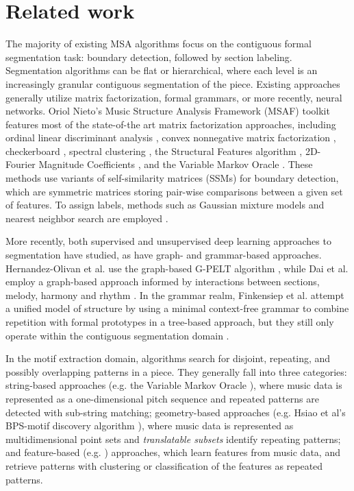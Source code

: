 \documentclass{article}
\begin{document}
\section{Related work}\label{sec:related_work}
The majority of existing MSA algorithms focus on the contiguous formal segmentation task: boundary detection, followed by section labeling. Segmentation algorithms can be flat or hierarchical, where each level is an increasingly granular contiguous segmentation of the piece. Existing approaches generally utilize matrix factorization, formal grammars, or more recently, neural networks. Oriol Nieto's Music Structure Analysis Framework (MSAF) toolkit \cite{msaf} features most of the state-of-the art matrix factorization approaches, including ordinal linear discriminant analysis \cite{olda}, convex nonnegative matrix factorization \cite{cnmf}, checkerboard \cite{checkerboard}, spectral clustering \cite{scluster}, the Structural Features algorithm \cite{sf}, 2D-Fourier Magnitude Coefficients \cite{2dfmc}, and the Variable Markov Oracle \cite{vmo_segmentation}. These methods use variants of self-similarity matrices (SSMs) for boundary detection, which are symmetric matrices storing pair-wise comparisons between a given set of features. To assign labels, methods such as Gaussian mixture models and nearest neighbor search are employed \cite{msaf}. 

More recently, both supervised \cite{wang_2021} and unsupervised \cite{mccallum_2021, buisson_2022} deep learning approaches to segmentation have studied, as have graph- and grammar-based approaches. Hernandez-Olivan et al. use the graph-based G-PELT algorithm \cite{musicaiz}, while Dai et al. employ a graph-based approach informed by interactions between sections, melody, harmony and rhythm \cite{cmu_dannenberg_2020}. In the grammar realm, Finkensiep et al. attempt a unified model of structure by using a minimal context-free grammar to combine repetition with formal prototypes in a tree-based approach, but they still only operate within the contiguous segmentation domain \cite{repetition_grammars_ismir2023}. 

In the motif extraction domain, algorithms search for disjoint, repeating, and possibly overlapping patterns in a piece. They generally fall into three categories: string-based approaches (e.g. the Variable Markov Oracle \cite{vmo_motifs}), where music data is represented as a one-dimensional pitch sequence and repeated patterns are detected with sub-string matching; geometry-based approaches (e.g. Hsiao et al's BPS-motif discovery algorithm \cite{Hsiao_2023_motifs}), where music data is represented as multidimensional point sets and \textit{translatable subsets} identify repeating patterns; and feature-based (e.g. \cite{features_motifs}) approaches, which learn features from music data, and retrieve patterns with clustering or classification of the features as repeated patterns.
\end{document}
